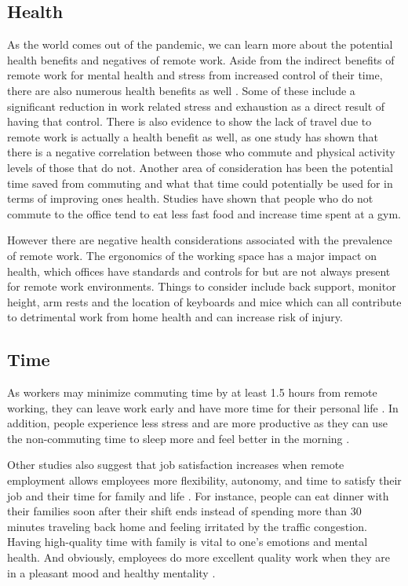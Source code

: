 \documentclass[12pt]{article}
\begin{document}
\subsection*{Health}

As the world comes out of the pandemic, we can learn more about the potential health benefits and negatives of remote work. Aside from the indirect benefits of remote work for mental health and stress from increased control of their time, there are also numerous health benefits as well \cite{doi:10.1177/1529100615593273}. Some of these include a significant reduction in work related stress and exhaustion as a direct result of having that control. There is also evidence to show the lack of travel due to remote work is actually a health benefit as well, as one study has shown that there is a negative correlation between those who commute and physical activity levels of those that do not\cite{HOEHNER2012571}. Another area of consideration has been the potential time saved from commuting and what that time could potentially be used for in terms of improving ones health. Studies have shown that people who do not commute to the office tend to eat less fast food and increase time spent at a gym\cite{allen2008workplace}. 

However there are negative health considerations associated with the prevalence of remote work. The ergonomics of the working space has a major impact on health, which offices have standards and controls for but are not always present for remote work environments. Things to consider include back support, monitor height, arm rests and the location of keyboards and mice which can all contribute to detrimental work from home health and can increase risk of injury\cite{ellison2012ergonomics}. 

\subsection*{Time}

As workers may minimize commuting time by at least 1.5 hours from remote working, they can leave work early and have more time for their personal life \cite{george2022}. In addition, people experience less stress and are more productive as they can use the non-commuting time to sleep more and feel better in the morning \cite{george2022}.

Other studies also suggest that job satisfaction increases when remote employment allows employees more flexibility, autonomy, and time to satisfy their job and their time for family and life \cite{natasha2016}. For instance, people can eat dinner with their families soon after their shift ends instead of spending more than 30 minutes traveling back home and feeling irritated by the traffic congestion. Having high-quality time with family is vital to one’s emotions and mental health. And obviously, employees do more excellent quality work when they are in a pleasant mood and healthy mentality \cite{natasha2016}.
\end{document}

